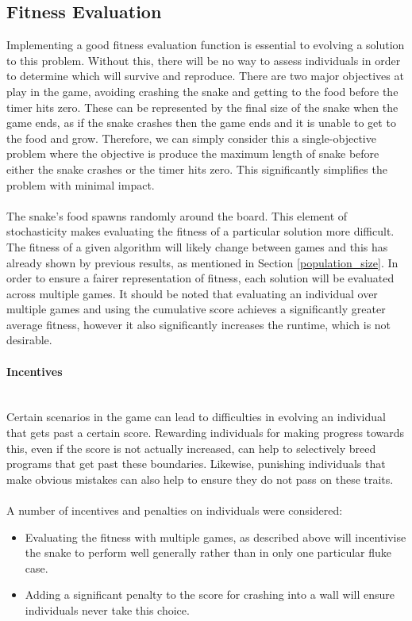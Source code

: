 \documentclass[12pt]{article}
\newcommand{\myparagraph}[1]{\paragraph{#1}\mbox{}\\}
\begin{document}
\subsection{Fitness Evaluation}
\label{fitness_evaluation}
Implementing a good fitness evaluation function is essential to evolving a solution to this problem. Without this, there will be no way to assess individuals in order to determine which will survive and reproduce. There are two major objectives at play in the game, avoiding crashing the snake and getting to the food before the timer hits zero. These can be represented by the final size of the snake when the game ends, as if the snake crashes then the game ends and it is unable to get to the food and grow. Therefore, we can simply consider this a single-objective problem where the objective is produce the maximum length of snake before either the snake crashes or the timer hits zero. This significantly simplifies the problem with minimal impact.
\\\\
The snake's food spawns randomly around the board. This element of stochasticity makes evaluating the fitness of a particular solution more difficult. The fitness of a given algorithm will likely change between games and this has already shown by previous results, as mentioned in Section \ref{population_size}. In order to ensure a fairer representation of fitness, each solution will be evaluated across multiple games. It should be noted that evaluating an individual over multiple games and using the cumulative score achieves a significantly greater average fitness, however it also significantly increases the runtime, which is not desirable.

\myparagraph{Incentives}
Certain scenarios in the game can lead to difficulties in evolving an individual that gets past a certain score. Rewarding individuals for making progress towards this, even if the score is not actually increased, can help to selectively breed programs that get past these boundaries. Likewise, punishing individuals that make obvious mistakes can also help to ensure they do not pass on these traits.
\\\\
A number of incentives and penalties on individuals were considered:
\begin{itemize}
	\item Evaluating the fitness with multiple games, as described above will incentivise the snake to perform well generally rather than in only one particular fluke case.
	\item Adding a significant penalty to the score for crashing into a wall will ensure individuals never take this choice.
\end{itemize}
\end{document}
